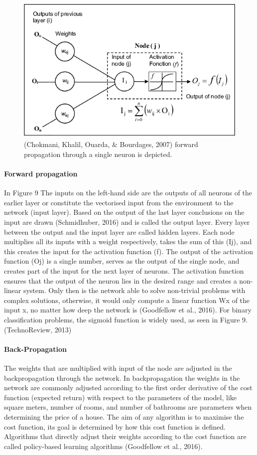 \begin{figure}[h]
	\includegraphics[width=\columnwidth]{fig9.png} 
	\caption{(Chokmani, Khalil, Ouarda, \& Bourdages, 2007) forward propagation through a single neuron is depicted.}
\end{figure}
\paragraph{Forward propagation}
In Figure 9  The inputs on the left-hand side are the outputs of all neurons of the earlier layer or constitute the vectorised input from the environment to the network (input layer). Based on the output of the last layer conclusions on the input are drawn (Schmidhuber, 2016) and is called the output layer. Every layer between the output and the input layer are called hidden layers. Each node multiplies all its inputs with a weight respectively, takes the sum of this (Ij), and this creates the input for the activation function (f). The output of the activation function (Oj) is a single number, serves as the output of the single node, and creates part of the input for the next layer of neurons. The activation function ensures that the output of the neuron lies in the desired range and creates a non-linear system. Only then is the network able to solve non-trivial problems with complex solutions, otherwise, it would only compute a linear function Wx of the input x, no matter how deep the network is (Goodfellow et al., 2016). For binary classification problems, the sigmoid function is widely used, as seen in Figure 9. (TechnoReview, 2013)

\paragraph{Back-Propagation}
The weights that are multiplied with input of the node are adjusted in the backpropagation through the network. In backpropagation the weights in the network are commonly adjusted according to the first order derivative of the cost function (expected return) with respect to the parameters of the model, like square meters, number of rooms, and number of bathrooms are parameters when determining the price of a house. The aim of any algorithm is to maximise the cost function, its goal is determined by how this cost function is defined. Algorithms that directly adjust their weights according to the cost function are called policy-based learning algorithms (Goodfellow et al., 2016).

